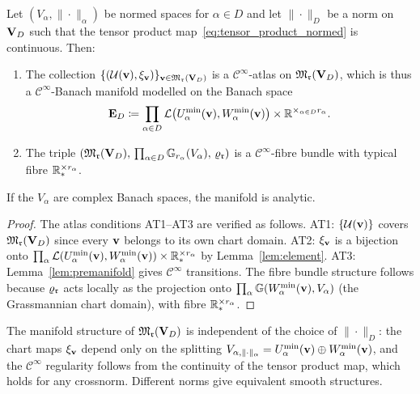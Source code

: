 \begin{theorem}
\label{thm:Tucker_Banach_Manifold}
Let $(V_\alpha, \|\cdot\|_\alpha)$ be normed spaces for $\alpha \in D$
and let $\|\cdot\|_D$ be a norm on $\mathbf{V}_D$ such that the tensor product
map~\eqref{eq:tensor_product_normed} is continuous. Then:
\begin{enumerate}
\item[\textup{(i)}] The collection $\{(\mathcal{U}(\mathbf{v}), \xi_{\mathbf{v}})\}_{\mathbf{v} \in
    \mathfrak{M}_{\mathfrak{r}}(\mathbf{V}_D)}$ is a $\mathcal{C}^\infty$-atlas on
    $\mathfrak{M}_{\mathfrak{r}}(\mathbf{V}_D)$, which is thus a $\mathcal{C}^\infty$-Banach
    manifold modelled on the Banach space
    \begin{equation}
    \label{eq:tucker_model_space}
        \mathbf{E}_{D} \coloneqq
        \prod_{\alpha \in D}
        \mathcal{L}\bigl(U^{\min}_{\alpha}(\mathbf{v}), W^{\min}_{\alpha}(\mathbf{v})\bigr)
        \times \mathbb{R}^{\times_{\alpha \in D} r_\alpha}.
    \end{equation}
\item[\textup{(ii)}] The triple $(\mathfrak{M}_{\mathfrak{r}}(\mathbf{V}_D),\,
    \prod_{\alpha \in D}\mathbb{G}_{r_\alpha}(V_\alpha),\, \varrho_{\mathfrak{r}})$
    is a $\mathcal{C}^\infty$-fibre bundle with typical fibre
    $\mathbb{R}^{\times r_\alpha}_*$.
\end{enumerate}
If the $V_\alpha$ are complex Banach spaces, the manifold is analytic.
\end{theorem}

\begin{proof}
The atlas conditions AT1--AT3 are verified as follows.
AT1: $\{\mathcal{U}(\mathbf{v})\}$ covers $\mathfrak{M}_{\mathfrak{r}}(\mathbf{V}_D)$ since every
$\mathbf{v}$ belongs to its own chart domain.
AT2: $\xi_{\mathbf{v}}$ is a bijection onto
$\prod_\alpha \mathcal{L}(U^{\min}_{\alpha}(\mathbf{v}), W^{\min}_{\alpha}(\mathbf{v})) \times
\mathbb{R}^{\times r_\alpha}_*$ by Lemma~\ref{lem:element}.
AT3: Lemma~\ref{lem:premanifold} gives $\mathcal{C}^\infty$ transitions.
The fibre bundle structure follows because $\varrho_{\mathfrak{r}}$ acts locally
as the projection onto $\prod_\alpha \mathbb{G}(W^{\min}_{\alpha}(\mathbf{v}), V_\alpha)$
(the Grassmannian chart domain), with fibre $\mathbb{R}^{\times r_\alpha}_*$.
\end{proof}

\begin{remark}
\label{rem:norm_independence}
The manifold structure of $\mathfrak{M}_{\mathfrak{r}}(\mathbf{V}_D)$ is independent of the
choice of $\|\cdot\|_D$: the chart maps $\xi_{\mathbf{v}}$ depend only
on the splitting $V_{\alpha,\|\cdot\|_\alpha} = U^{\min}_{\alpha}(\mathbf{v})
\oplus W^{\min}_{\alpha}(\mathbf{v})$, and the $\mathcal{C}^\infty$ regularity
follows from the continuity of the tensor product map, which holds for
any crossnorm. Different norms give equivalent smooth structures.
\end{remark}

